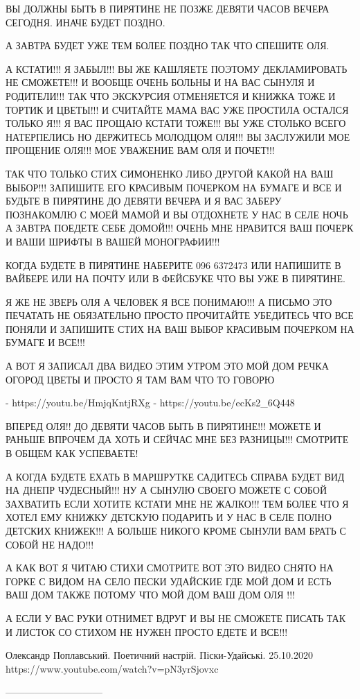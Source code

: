 ВЫ ДОЛЖНЫ БЫТЬ В ПИРЯТИНЕ НЕ ПОЗЖЕ ДЕВЯТИ ЧАСОВ ВЕЧЕРА СЕГОДНЯ. ИНАЧЕ БУДЕТ ПОЗДНО.

А ЗАВТРА БУДЕТ УЖЕ ТЕМ БОЛЕЕ ПОЗДНО ТАК ЧТО СПЕШИТЕ ОЛЯ.

А КСТАТИ!!! Я ЗАБЫЛ!!! ВЫ ЖЕ КАШЛЯЕТЕ ПОЭТОМУ ДЕКЛАМИРОВАТЬ НЕ СМОЖЕТЕ!!!
И ВООБЩЕ ОЧЕНЬ БОЛЬНЫ И НА ВАС СЫНУЛЯ И РОДИТЕЛИ!!! ТАК ЧТО ЭКСКУРСИЯ ОТМЕНЯЕТСЯ И КНИЖКА ТОЖЕ И ТОРТИК И ЦВЕТЫ!!!
И СЧИТАЙТЕ МАМА ВАС УЖЕ ПРОСТИЛА ОСТАЛСЯ ТОЛЬКО Я!!! Я ВАС ПРОЩАЮ КСТАТИ ТОЖЕ!!!
ВЫ УЖЕ СТОЛЬКО ВСЕГО НАТЕРПЕЛИСЬ НО ДЕРЖИТЕСЬ МОЛОДЦОМ ОЛЯ!!! 
ВЫ ЗАСЛУЖИЛИ МОЕ ПРОЩЕНИЕ ОЛЯ!!! МОЕ УВАЖЕНИЕ ВАМ ОЛЯ И ПОЧЕТ!!!

ТАК ЧТО ТОЛЬКО СТИХ СИМОНЕНКО ЛИБО ДРУГОЙ КАКОЙ НА ВАШ ВЫБОР!!! 
ЗАПИШИТЕ ЕГО КРАСИВЫМ ПОЧЕРКОМ НА БУМАГЕ И ВСЕ И БУДЬТЕ В ПИРЯТИНЕ ДО ДЕВЯТИ ВЕЧЕРА И Я ВАС
ЗАБЕРУ ПОЗНАКОМЛЮ С МОЕЙ МАМОЙ И ВЫ ОТДОХНЕТЕ У НАС В СЕЛЕ НОЧЬ А ЗАВТРА ПОЕДЕТЕ СЕБЕ ДОМОЙ!!!
ОЧЕНЬ МНЕ НРАВИТСЯ ВАШ ПОЧЕРК И ВАШИ ШРИФТЫ В ВАШЕЙ МОНОГРАФИИ!!!

КОГДА БУДЕТЕ В ПИРЯТИНЕ НАБЕРИТЕ 096 6372473 ИЛИ НАПИШИТЕ В ВАЙБЕРЕ ИЛИ НА
ПОЧТУ ИЛИ В ФЕЙСБУКЕ ЧТО ВЫ УЖЕ В ПИРЯТИНЕ.

Я ЖЕ НЕ ЗВЕРЬ ОЛЯ А ЧЕЛОВЕК Я ВСЕ ПОНИМАЮ!!! А ПИСЬМО ЭТО ПЕЧАТАТЬ НЕ ОБЯЗАТЕЛЬНО ПРОСТО
ПРОЧИТАЙТЕ УБЕДИТЕСЬ ЧТО ВСЕ ПОНЯЛИ И ЗАПИШИТЕ СТИХ НА ВАШ ВЫБОР КРАСИВЫМ ПОЧЕРКОМ НА БУМАГЕ И ВСЕ!!!

А ВОТ Я ЗАПИСАЛ ДВА ВИДЕО ЭТИМ УТРОМ ЭТО МОЙ ДОМ 
РЕЧКА ОГОРОД ЦВЕТЫ И ПРОСТО Я ТАМ ВАМ ЧТО ТО ГОВОРЮ

- https://youtu.be/HmjqKntjRXg
- https://youtu.be/ecKs2_6Q448

ВПЕРЕД ОЛЯ!! ДО ДЕВЯТИ ЧАСОВ БЫТЬ В ПИРЯТИНЕ!!! 
МОЖЕТЕ И РАНЬШЕ ВПРОЧЕМ ДА ХОТЬ И СЕЙЧАС МНЕ БЕЗ РАЗНИЦЫ!!!
СМОТРИТЕ В ОБЩЕМ КАК УСПЕВАЕТЕ!

А КОГДА БУДЕТЕ ЕХАТЬ В МАРШРУТКЕ САДИТЕСЬ СПРАВА БУДЕТ ВИД НА ДНЕПР ЧУДЕСНЫЙ!!!
НУ А СЫНУЛЮ СВОЕГО МОЖЕТЕ С СОБОЙ ЗАХВАТИТЬ ЕСЛИ ХОТИТЕ КСТАТИ МНЕ НЕ ЖАЛКО!!!
ТЕМ БОЛЕЕ ЧТО Я ХОТЕЛ ЕМУ КНИЖКУ ДЕТСКУЮ ПОДАРИТЬ И У НАС В СЕЛЕ ПОЛНО 
ДЕТСКИХ КНИЖЕК!!! А БОЛЬШЕ НИКОГО КРОМЕ СЫНУЛИ ВАМ БРАТЬ С СОБОЙ НЕ НАДО!!!

А КАК ВОТ Я ЧИТАЮ СТИХИ СМОТРИТЕ ВОТ ЭТО ВИДЕО 
СНЯТО НА ГОРКЕ С ВИДОМ НА СЕЛО ПЕСКИ УДАЙСКИЕ ГДЕ МОЙ ДОМ 
И ЕСТЬ ВАШ ДОМ ТАКЖЕ ПОТОМУ ЧТО МОЙ ДОМ ВАШ ДОМ ОЛЯ !!!

А ЕСЛИ У ВАС РУКИ ОТНИМЕТ ВДРУГ И ВЫ НЕ СМОЖЕТЕ ПИСАТЬ ТАК И ЛИСТОК СО СТИХОМ 
НЕ НУЖЕН ПРОСТО ЕДЕТЕ И ВСЕ!!!

Олександр Поплавський. Поетичний настрій. Піски-Удайські. 25.10.2020
https://www.youtube.com/watch?v=pN3yrSjovxc

------------------------------


